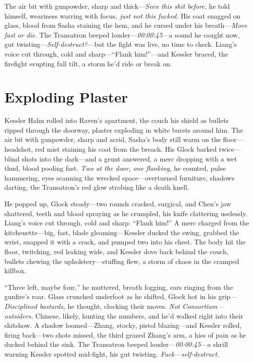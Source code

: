 \documentclass[12pt]{book}
\begin{document}
The air bit with gunpowder, sharp and thick—\textit{Seen this shit before,} he told himself, weariness warring with focus, \textit{just not this fucked.} His coat snagged on glass, blood from Sasha staining the hem, and he cursed under his breath—\textit{Move fast or die.} The Transatron beeped louder—\textit{00:00:45}—a sound he caught now, gut twisting—\textit{Self-destruct?}—but the fight was live, no time to check. Liang’s voice cut through, cold and sharp—“Flank him!”—and Kessler braced, the firefight erupting full tilt, a storm he’d ride or break on.

\section{Exploding Plaster}

Kessler Hahn rolled into Raven’s apartment, the couch his shield as bullets ripped through the doorway, plaster exploding in white bursts around him. The air bit with gunpowder, sharp and acrid, Sasha’s body still warm on the floor—headshot, red mist staining his coat from the breach. His Glock barked twice—blind shots into the dark—and a grunt answered, a merc dropping with a wet thud, blood pooling fast. \textit{Two at the door, one flanking,} he counted, pulse hammering, eyes scanning the wrecked space—overturned furniture, shadows darting, the Transatron’s red glow strobing like a death knell.

He popped up, Glock steady—two rounds cracked, surgical, and Chen’s jaw shattered, teeth and blood spraying as he crumpled, his knife clattering uselessly. Liang’s voice cut through, cold and sharp: “Flank him!” A merc charged from the kitchenette—big, fast, blade gleaming—Kessler ducked the swing, grabbed the wrist, snapped it with a crack, and pumped two into his chest. The body hit the floor, twitching, red leaking wide, and Kessler dove back behind the couch, bullets chewing the upholstery—stuffing flew, a storm of chaos in the cramped killbox.

“Three left, maybe four,” he muttered, breath fogging, ears ringing from the gunfire’s roar. Glass crunched underfoot as he shifted, Glock hot in his grip—\textit{Disciplined bastards,} he thought, clocking their moves. \textit{Not Consortium—outsiders.} Chinese, likely, hunting the numbers, and he’d walked right into their shitshow. A shadow loomed—Zhang, stocky, pistol blazing—and Kessler rolled, firing back—two shots missed, the third grazed Zhang’s arm, a hiss of pain as he ducked behind the sink. The Transatron beeped louder—\textit{00:00:45}—a shrill warning Kessler spotted mid-fight, his gut twisting. \textit{Fuck—self-destruct.}
\end{document}
